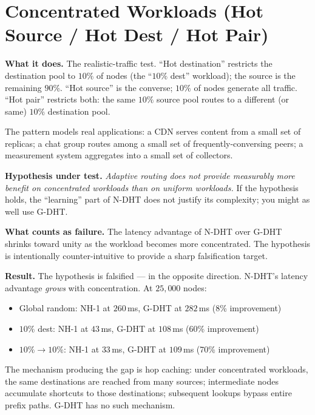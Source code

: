 \documentclass[twoside,nobib]{tufte-book}
\newcommand{\NDHT}{N-DHT\xspace}
\newcommand{\GDHT}{G-DHT\xspace}
\begin{document}
\section{Concentrated Workloads (Hot Source / Hot Dest / Hot Pair)}

\textbf{What it does.} The realistic-traffic test. ``Hot
destination'' restricts the destination pool to $10\%$ of nodes
(the ``$10\%$ dest'' workload); the source is the remaining
$90\%$. ``Hot source'' is the converse; $10\%$ of nodes generate
all traffic. ``Hot pair'' restricts both: the same $10\%$ source
pool routes to a different (or same) $10\%$ destination pool.

The pattern models real applications: a CDN serves content from
a small set of replicas; a chat group routes among a small set
of frequently-conversing peers; a measurement system aggregates
into a small set of collectors.

\textbf{Hypothesis under test.} \emph{Adaptive routing does not
provide measurably more benefit on concentrated workloads than
on uniform workloads.} If the hypothesis holds, the
``learning'' part of \NDHT does not justify its complexity; you
might as well use \GDHT.

\textbf{What counts as failure.} The latency advantage of \NDHT
over \GDHT shrinks toward unity as the workload becomes more
concentrated. The hypothesis is intentionally counter-intuitive
to provide a sharp falsification target.

\textbf{Result.} The hypothesis is falsified --- in the opposite
direction. \NDHT's latency advantage \emph{grows} with
concentration. At $25{,}000$ nodes:

\begin{itemize}\setlength\itemsep{0.1em}
  \item Global random: NH-1 at $260$\,ms, \GDHT at $282$\,ms (8\% improvement)
  \item $10\%$ dest: NH-1 at $43$\,ms, \GDHT at $108$\,ms (60\% improvement)
  \item $10\% \to 10\%$: NH-1 at $33$\,ms, \GDHT at $109$\,ms (70\% improvement)
\end{itemize}

The mechanism producing the gap is hop caching: under
concentrated workloads, the same destinations are reached from
many sources; intermediate nodes accumulate shortcuts to those
destinations; subsequent lookups bypass entire prefix paths. \GDHT
has no such mechanism.
\end{document}
